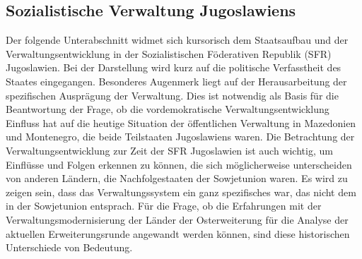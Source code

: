 \subsection{Sozialistische Verwaltung Jugoslawiens}
Der folgende Unterabschnitt widmet sich kursorisch dem Staatsaufbau und der Verwaltungsentwicklung in der Sozialistischen Föderativen Republik (SFR) Jugoslawien. Bei der Darstellung wird kurz auf die politische Verfasstheit des Staates eingegangen. Besonderes Augenmerk liegt auf der Herausarbeitung der spezifischen Ausprägung der Verwaltung. Dies ist notwendig als Basis für die Beantwortung der Frage, ob die vordemokratische Verwaltungsentwicklung Einfluss hat auf die heutige Situation der öffentlichen Verwaltung in Mazedonien und Montenegro, die beide Teilstaaten Jugoslawiens waren. Die Betrachtung der Verwaltungsentwicklung zur Zeit der SFR Jugoslawien ist auch wichtig, um Einflüsse und Folgen erkennen zu können, die sich möglicherweise unterscheiden von anderen Ländern, die Nachfolgestaaten der Sowjetunion waren. Es wird zu zeigen sein, dass das Verwaltungssystem ein ganz spezifisches war, das nicht dem in der Sowjetunion entsprach. Für die Frage, ob die Erfahrungen mit der Verwaltungsmodernisierung der Länder der Osterweiterung für die Analyse der aktuellen Erweiterungsrunde angewandt werden können, sind diese historischen Unterschiede von Bedeutung.
